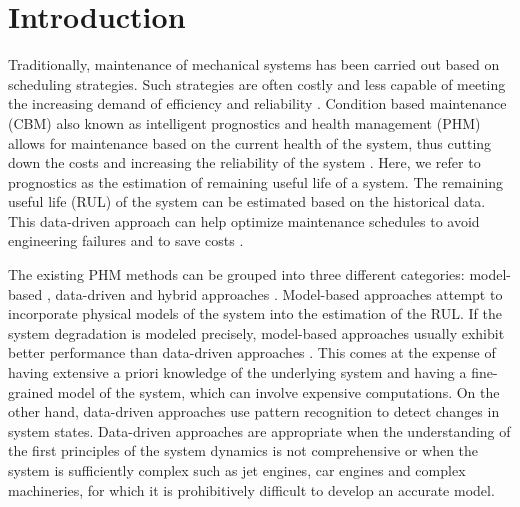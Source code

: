 \documentclass[preprint,12pt]{elsarticle}%
\begin{document}
%



\section{Introduction}

\label{sec:rul_intro}

Traditionally, maintenance of mechanical systems has been carried out based on
scheduling strategies. Such strategies are often costly and less capable of
meeting the increasing demand of efficiency and reliability
\cite{Gebraeel2005, Zaidan2013}. Condition based maintenance (CBM) also known
as intelligent prognostics and health management (PHM) allows for maintenance
based on the current health of the system, thus cutting down the costs and increasing
the reliability of the system \cite{Zhao2017}. Here, we refer to prognostics
as the estimation of remaining useful life of a system. The remaining useful life (RUL) of
the system can be estimated based on the historical data. This data-driven
approach can help optimize maintenance schedules to avoid engineering failures
and to save costs \cite{Lee2014}.

The existing PHM methods can be grouped into three different categories:
model-based \cite{Yu2001}, data-driven \cite{Liu2009, Mosallam2013} and
hybrid approaches \cite{Pecht2010, Liu2012}. Model-based approaches attempt to
incorporate physical models of the system into the estimation of the RUL. If
the system degradation is modeled precisely, model-based approaches usually
exhibit better performance than data-driven approaches \cite{Qian2017}. This
comes at the expense of having extensive a priori knowledge of the underlying
system and having a fine-grained model of the system, which can involve
expensive computations. On the other hand, data-driven approaches use pattern
recognition to detect changes in system states. Data-driven approaches are
appropriate when the understanding of the first principles of the system
dynamics is not comprehensive or when the system is sufficiently complex such as
jet engines, car engines and complex machineries, for which it is prohibitively difficult 
to develop an accurate model.
\end{document}
